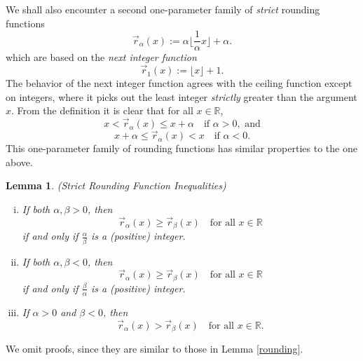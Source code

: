 \documentclass[12pt,letterpaper, reqno]{amsart}
\newtheorem{lem}[thm]{Lemma}
\theoremstyle{definition}
\theoremstyle{remark}
\newcommand{\RR}{\ensuremath{\mathbb{R}}}
\newcommand{\floor}[1]{\lfloor{#1}\rfloor}
\newcommand{\tround}{\vec{r}}
\begin{document}
We shall also encounter a second one-parameter family of {\em strict} rounding functions
\begin{equation}
\tround_\alpha(x) :=  \alpha\floor{\frac1\alpha x}+\alpha.
\end{equation}
which are based on the {\em next integer function}
$$
\tround_1(x) := \floor{x}+1.
$$
The behavior of the next integer function
agrees with  the ceiling function except on integers, where it picks out the least integer {\em strictly} greater than the argument $x$. 
From the definition it is clear that for all $x\in\RR$,
\[ x < \vec{r}_\alpha(x) \leq x+\alpha \quad\text{if }\alpha>0, \text{ and}\]
\[ x+\alpha\leq \vec{r}_\alpha(x) < x \quad\text{if }\alpha<0.\]
This one-parameter family of rounding  functions has similar properties to the one above. 

\begin{lem} \label{strict-rounding} {\em (Strict Rounding Function Inequalities)}

\begin{enumerate}[(i)]
\item[(i)]  If both $\alpha,\beta>0$, then
\[ \vec{r}_\alpha(x) \geq \vec{r}_\beta(x)  \quad\text{for all }x\in\RR\]
if and only if $\frac{\alpha}{\beta}$ is a (positive) integer.
\item[(ii)]  If both $\alpha,\beta<0$, then
\[  \vec{r}_\alpha(x) \geq \vec{r}_\beta(x) \quad\text{for all }x\in\RR\]
if and only if $\frac{\beta}{\alpha}$ is a (positive) integer.
\item[(iii)] If $\alpha>0$ and $\beta<0$, then
\[ \vec{r}_\alpha(x) > \vec{r}_\beta(x) \quad\text{for all }x\in\RR.\]
\end{enumerate}
\end{lem}
We omit proofs, since they are similar to those in Lemma \ref{rounding}.

% 
\end{document}
